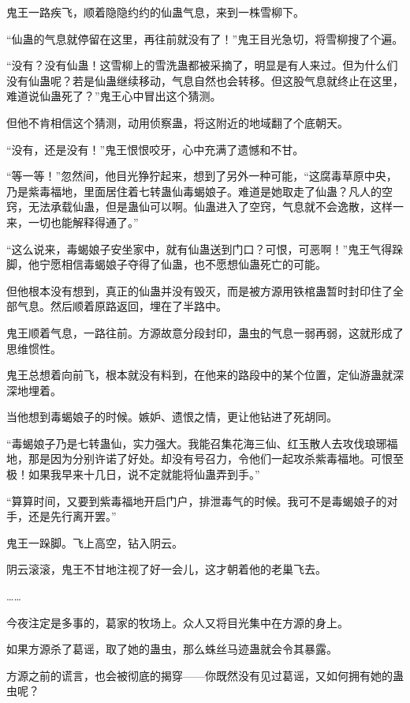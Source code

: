 
\begin{this_body}

鬼王一路疾飞，顺着隐隐约约的仙蛊气息，来到一株雪柳下。

“仙蛊的气息就停留在这里，再往前就没有了！”鬼王目光急切，将雪柳搜了个遍。

“没有？没有仙蛊！这雪柳上的雪洗蛊都被采摘了，明显是有人来过。但为什么们没有仙蛊呢？若是仙蛊继续移动，气息自然也会转移。但这股气息就终止在这里，难道说仙蛊死了？”鬼王心中冒出这个猜测。

但他不肯相信这个猜测，动用侦察蛊，将这附近的地域翻了个底朝天。

“没有，还是没有！”鬼王恨恨咬牙，心中充满了遗憾和不甘。

“等一等！”忽然间，他目光狰狞起来，想到了另外一种可能，“这腐毒草原中央，乃是紫毒福地，里面居住着七转蛊仙毒蝎娘子。难道是她取走了仙蛊？凡人的空窍，无法承载仙蛊，但是蛊仙可以啊。仙蛊进入了空窍，气息就不会逸散，这样一来，一切也能解释得通了。”

“这么说来，毒蝎娘子安坐家中，就有仙蛊送到门口？可恨，可恶啊！”鬼王气得跺脚，他宁愿相信毒蝎娘子夺得了仙蛊，也不愿想仙蛊死亡的可能。

但他根本没有想到，真正的仙蛊并没有毁灭，而是被方源用铁棺蛊暂时封印住了全部气息。然后顺着原路返回，埋在了半路中。

鬼王顺着气息，一路往前。方源故意分段封印，蛊虫的气息一弱再弱，这就形成了思维惯性。

鬼王总想着向前飞，根本就没有料到，在他来的路段中的某个位置，定仙游蛊就深深地埋着。

当他想到毒蝎娘子的时候。嫉妒、遗恨之情，更让他钻进了死胡同。

“毒蝎娘子乃是七转蛊仙，实力强大。我能召集花海三仙、红玉散人去攻伐琅琊福地，那是因为分别许诺了好处。却没有号召力，令他们一起攻杀紫毒福地。可恨至极！如果我早来十几日，说不定就能将仙蛊弄到手。”

“算算时间，又要到紫毒福地开启门户，排泄毒气的时候。我可不是毒蝎娘子的对手，还是先行离开罢。”

鬼王一跺脚。飞上高空，钻入阴云。

阴云滚滚，鬼王不甘地注视了好一会儿，这才朝着他的老巢飞去。

……

今夜注定是多事的，葛家的牧场上。众人又将目光集中在方源的身上。

如果方源杀了葛谣，取了她的蛊虫，那么蛛丝马迹蛊就会令其暴露。

方源之前的谎言，也会被彻底的揭穿——你既然没有见过葛谣，又如何拥有她的蛊虫呢？


\end{this_body}
